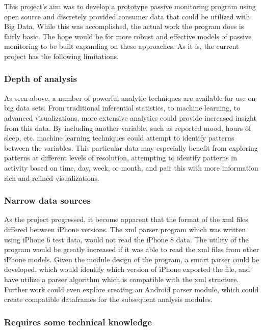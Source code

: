 \documentclass[sigconf]{acmart}
\begin{document}
This project's aim was to develop a prototype passive monitoring program using open source and discretely provided consumer data that could be utilized with Big Data. While this was accomplished, the actual work the program does is fairly basic. The hope would be for more robust and effective models of passive monitoring to be built expanding on these approaches. As it is, the current project has the following limitations.

\subsubsection {Depth of analysis}

As seen above, a number of powerful analytic techniques are available for use on big data sets. From traditional inferential statistics, to machine learning, to advanced visualizations, more extensive analytics could provide increased insight from this data. By including another variable, such as reported mood, hours of sleep, etc. machine learning techniques could attempt to identify patterns between the variables. This particular data may especially benefit from exploring patterns at different levels of resolution, attempting to identify patterns in activity based on time, day, week, or month, and pair this with more information rich and refined visualizations. 

\subsubsection{Narrow data sources}

As the project progressed, it become apparent that the format of the xml files differed between iPhone versions. The xml parser program which was written using iPhone 6 test data, would not read the iPhone 8 data. The utility of the program would be greatly increased if it was able to read the xml files from other iPhone models. Given the module design of the program, a smart parser could be developed, which would identify which version of iPhone exported the file, and have utilize a parser algorithm which is compatible with the xml structure. Further work could even explore creating an Android parser module, which could create compatible dataframes for the subsequent analysis modules.

\subsubsection{Requires some technical knowledge}
\end{document}
